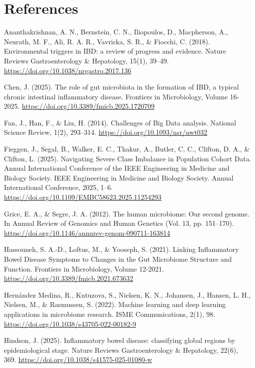\documentclass[twoside,twocolumn,10pt]{article}
\begin{document}
\section{References}
\fontsize{11}{13}\selectfont

Ananthakrishnan, A. N., Bernstein, C. N., Iliopoulos, D., Macpherson, A., Neurath, M. F., Ali, R. A. R., Vavricka, S. R., \& Fiocchi, C. (2018). Environmental triggers in IBD: a review of progress and evidence. Nature Reviews Gastroenterology \& Hepatology, 15(1), 39–49. \url{https://doi.org/10.1038/nrgastro.2017.136}

\medskip
Chen, J. (2025). The role of gut microbiota in the formation of IBD, a typical chronic intestinal inflammatory disease. Frontiers in Microbiology, Volume 16-2025. \url{https://doi.org/10.3389/fmicb.2025.1720709}

\medskip
Fan, J., Han, F., \& Liu, H. (2014). Challenges of Big Data analysis. National Science Review, 1(2), 293–314. \url{https://doi.org/10.1093/nsr/nwt032}

\medskip
Fieggen, J., Segal, B., Walker, E. C., Thakur, A., Butler, C. C., Clifton, D. A., \& Clifton, L. (2025). Navigating Severe Class Imbalance in Population Cohort Data. Annual International Conference of the IEEE Engineering in Medicine and Biology Society. IEEE Engineering in Medicine and Biology Society. Annual International Conference, 2025, 1–6. \url{https://doi.org/10.1109/EMBC58623.2025.11254293}

\medskip
Grice, E. A., \& Segre, J. A. (2012). The human microbiome: Our second genome. In Annual Review of Genomics and Human Genetics (Vol. 13, pp. 151–170). \url{https://doi.org/10.1146/annurev-genom-090711-163814}

\medskip
Hassouneh, S. A.-D., Loftus, M., \& Yooseph, S. (2021). Linking Inflammatory Bowel Disease Symptoms to Changes in the Gut Microbiome Structure and Function. Frontiers in Microbiology, Volume 12-2021. \url{https://doi.org/10.3389/fmicb.2021.673632}

\medskip
Hernández Medina, R., Kutuzova, S., Nielsen, K. N., Johansen, J., Hansen, L. H., Nielsen, M., \& Rasmussen, S. (2022). Machine learning and deep learning applications in microbiome research. ISME Communications, 2(1), 98. \url{https://doi.org/10.1038/s43705-022-00182-9}

\medskip
Hindson, J. (2025). Inflammatory bowel disease: classifying global regions by epidemiological stage. Nature Reviews Gastroenterology \& Hepatology, 22(6), 369. \url{https://doi.org/10.1038/s41575-025-01080-w}
\end{document}
